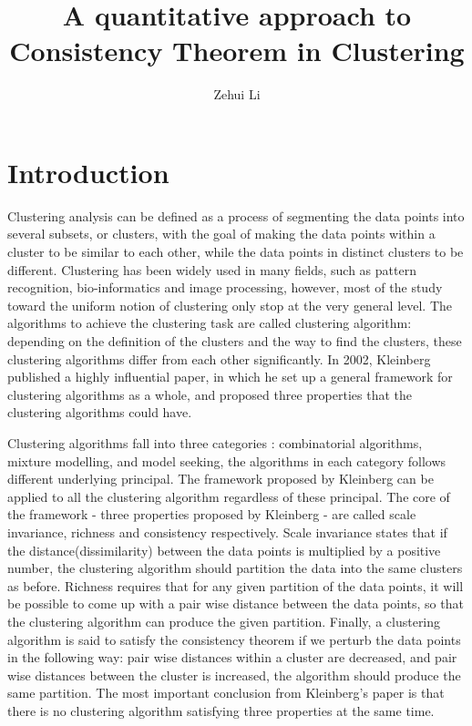 \documentclass{uonmathreport}
\title{A quantitative approach to Consistency Theorem in Clustering}
\author{Zehui Li}
\begin{document}
\maketitle

\begin{abstract}

\end{abstract}

\setcounter{tocdepth}{2}  %
\tableofcontents 
\newpage

\section{Introduction} \label{sec:intro}
Clustering analysis can be defined as a process of segmenting the data points into several subsets, or clusters, with the goal of making the data points within a cluster to be similar to each other, while the data points in distinct clusters to be different. Clustering has been widely used in many fields, such as pattern recognition, bio-informatics and image processing, however, most of the study toward the uniform notion of clustering only stop at the very general level. The algorithms to achieve the clustering task are called clustering algorithm: depending on the definition of the clusters and the way to find the clusters, these clustering algorithms differ from each other significantly. In 2002, Kleinberg \cite{Kleinberg} published a highly influential paper, in which he set up a general framework for clustering algorithms as a whole, and proposed three properties that the clustering algorithms could have.
\newline

\noindent
Clustering algorithms fall into three categories \cite{esl}: combinatorial algorithms, mixture modelling, and model seeking, the algorithms in each category follows different underlying principal. The framework proposed by Kleinberg can be applied to all the clustering algorithm regardless of these principal. The core of the framework - three properties proposed by Kleinberg - are called scale invariance, richness and consistency respectively. Scale invariance states that if the distance(dissimilarity) between the data points is multiplied by a positive number, the clustering algorithm should partition the data into the same clusters as before. Richness requires that for any given partition of the data points, it will be possible to come up with a pair wise distance between the data points, so that the clustering algorithm can produce the given partition. Finally, a clustering algorithm is said to satisfy the consistency theorem if we perturb the data points in the following way: pair wise distances within a cluster are decreased, and pair wise distances between the cluster is increased, the algorithm should produce the same partition. The most important conclusion from Kleinberg's paper is that there is no clustering algorithm satisfying three properties at the same time. 
\end{document}
